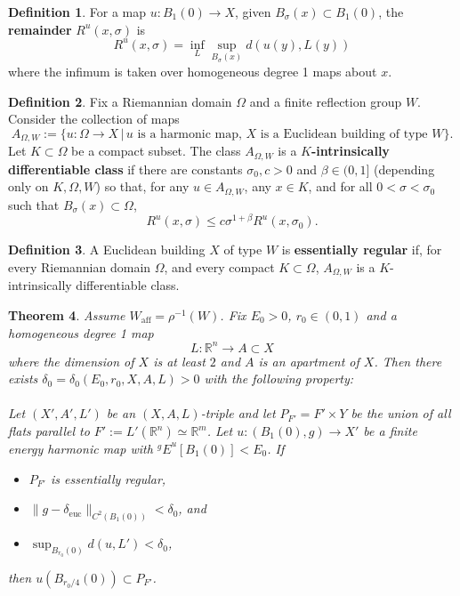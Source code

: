 \documentclass[12pt]{amsart}
\newtheorem{theorem}{Theorem}[section]
\theoremstyle{definition}
\newtheorem{definition}[theorem]{Definition}
\numberwithin{equation}{section}
\newcommand{\R}{\mathbb R}
\newcommand{\deltae}{\delta_{\text{euc}}}
\newcommand{\Waff}{W_{\mathrm{aff}}}
\begin{document}
\begin{definition}
For a map $u:B_1(0)\to X$, given $B_\sigma(x) \subset B_1(0)$, the {\bf remainder} $R^u(x,\sigma)$ is
\[
R^u(x,\sigma)=\inf_L\sup_{B_\sigma(x)}d(u(y),L(y))
\]
where the infimum is taken over homogeneous degree 1 maps  about $x$.
\end{definition}

\begin{definition}\label{def:aomegaw}
Fix a Riemannian domain $\Omega$ and a finite reflection group $W$. Consider the collection of maps $$A_{\Omega,W}:=\{u:\Omega\to X\,|\,u\text{ is a harmonic map, }X\text{ is a Euclidean building of type }W\}.$$   Let $K\subset\Omega$ be a compact subset. The class $A_{\Omega,W}$ is a {\bf $K$-intrinsically differentiable class} if there are constants $\sigma_0,c>0$ and $\beta\in(0,1]$ (depending only on $K,\Omega, W$) so that, for any $u\in A_{\Omega,W}$, any $x\in K$, and for all $0<\sigma<\sigma_0$ such that $B_\sigma(x) \subset \Omega$, 
\[
R^u(x,\sigma)\leq c\sigma^{1+\beta}R^u(x,\sigma_0).
\]
\end{definition}

\begin{definition} \label{def:essreg}
A Euclidean building $X$ of type $W$ is {\bf essentially regular} if, for every Riemannian domain $\Omega$, and every compact $K\subset\Omega$, $A_{\Omega,W}$ is a $K$-intrinsically differentiable class.
\end{definition}

\begin{theorem}\label{GS Theorem 5.1}
Assume $\Waff=\rho^{-1}(W)$.
Fix $E_0>0$,  $r_0 \in (0,1)$ and a  homogeneous degree 1 map 
\[
L:\R^n \rightarrow A \subset X
\]
where the dimension of $X$ is at least $2$ and $A$ is an apartment of $X$.   
Then there exists $\delta_0=\delta_0(E_0, r_0, X, A, L)>0$ with the following property: \\
\\
Let  $(X',A',L')$  be an $(X,A,L)$-triple and let $P_{F'}=F' \times Y$ be the union of all flats parallel to $F':=L'(\R^n)\simeq \R^m$.
Let $u:(B_1(0),g)\to X'$ be a finite energy harmonic map with ${^gE}^u[B_1(0)]<E_0$. 
If 
\begin{itemize}
\item $P_{F'}$ is  essentially regular, 
\item $\|g-\deltae\|_{C^2(B_1(0))}<\delta_0$, and
\item $\sup_{B_{r_0}(0)}d(u,L')<\delta_0$,
\end{itemize}
then $u(B_{r_0/4}(0))\subset P_{F'}$.
\end{theorem}
\end{document}
